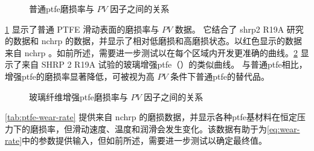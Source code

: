 \begin{figure}
  \caption{普通\acrlong*{ptfe}磨损率与 $PV$ 因子之间的关系}
  \label{fig:wear-rate-plain-ptfe}
\end{figure}

\cref{fig:wear-rate-plain-ptfe} 显示了普通 PTFE 滑动表面的磨损率与 $PV$ 数据。 它结合了 \gls*{shrp}2 R19A 研究的数据和 \gls*{nchrp}  \cite{stanton1999h} 的数据，并显示了相对低磨损和高磨损状态。以红色显示的数据来自 \gls*{nchrp} 。如前所述，需要进一步测试以在每个区域内开发更准确的曲线。\cref{fig:wear-rate-glass-reinforced-ptfe} 显示了来自 SHRP 2 R19A 试验的玻璃增强\acrlong*{ptfe}（\fluorogold）的类似曲线。 与普通\acrlong*{ptfe}相比，增强\acrlong*{ptfe}的磨损率显著降低，可被视为高 $PV$ 条件下普通\acrlong*{ptfe}的替代品。

\begin{figure}
  \caption{玻璃纤维增强\acrlong*{ptfe}磨损率与 $PV$ 因子之间的关系}
  \label{fig:wear-rate-glass-reinforced-ptfe}
\end{figure}

\cref{tab:ptfe-wear-rate} 提供来自 \gls*{nchrp}  \cite{stanton1999h} 的磨损数据，并显示各种\acrlong{ptfe}基材料在恒定压力下的磨损率，但滑动速度、温度和润滑会发生变化。该数据有助于为\cref{eq:wear-rate}中的参数提供输入，但如前所述，需要进一步测试以确定最终值。

